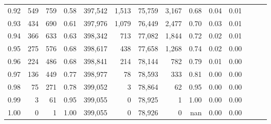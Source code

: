 \begin{tabular}{rrrrrrrrrrrrrr}
0.92 &    549 &    759 &  0.58 &  397,542 &    1,513 &  75,759 &   3,167 &  0.68 &  0.04 &      0.01 \\
0.93 &    434 &    690 &  0.61 &  397,976 &    1,079 &  76,449 &   2,477 &  0.70 &  0.03 &      0.01 \\
0.94 &    366 &    633 &  0.63 &  398,342 &      713 &  77,082 &   1,844 &  0.72 &  0.02 &      0.01 \\
0.95 &    275 &    576 &  0.68 &  398,617 &      438 &  77,658 &   1,268 &  0.74 &  0.02 &      0.00 \\
0.96 &    224 &    486 &  0.68 &  398,841 &      214 &  78,144 &     782 &  0.79 &  0.01 &      0.00 \\
0.97 &    136 &    449 &  0.77 &  398,977 &       78 &  78,593 &     333 &  0.81 &  0.00 &      0.00 \\
0.98 &     75 &    271 &  0.78 &  399,052 &        3 &  78,864 &      62 &  0.95 &  0.00 &      0.00 \\
0.99 &      3 &     61 &  0.95 &  399,055 &        0 &  78,925 &       1 &  1.00 &  0.00 &      0.00 \\
1.00 &      0 &      1 &  1.00 &  399,055 &        0 &  78,926 &       0 &   nan &  0.00 &      0.00 \\
\bottomrule
\end{tabular}
